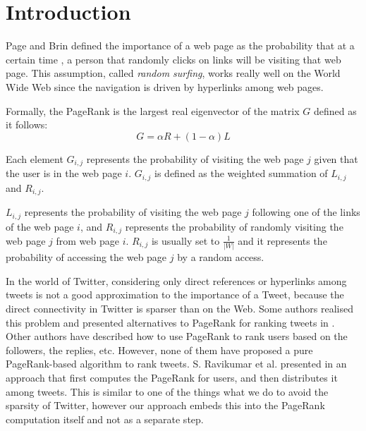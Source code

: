 \section{Introduction}
Page and Brin defined the importance of a web page as the probability that at a certain time \cite{pagebmw98}, a person that randomly clicks on links will be visiting that web page. This assumption, called \emph{random surfing}, works really well on the World Wide Web since the navigation is driven by hyperlinks among web pages. 

Formally, the PageRank is the largest real eigenvector of the matrix $G$ defined as it follows:
\begin{equation}\label{eq:basic_pr}
G = \alpha R + (1-\alpha) L
\end{equation}

Each element $G_{i,j}$ represents the probability of visiting the web page $j$ given that the user is in the web page $i$. $G_{i,j}$ is defined as the weighted summation of $L_{i,j}$ and $R_{i,j}$.

$L_{i,j}$ represents the probability of visiting the web page $j$ following one of the links of the web page $i$, and $R_{i,j}$ represents the probability of randomly visiting the web page $j$ from web page $i$. $R_{i,j}$ is usually set to $\frac{1}{|W|}$ and it represents the probability of accessing the web page $j$ by a random access. 

In the world of Twitter, considering only direct references or hyperlinks among tweets is not a good approximation to the importance of a Tweet, because the direct connectivity in Twitter is sparser than on the Web. Some authors realised this problem and presented alternatives to PageRank for ranking tweets in \cite{Duan:2010:ESL:1873781.1873815,DBLP:conf/webi/NagmotiTC10}. Other authors \cite{Duan:2010:ESL:1873781.1873815,Kwak:2010:TSN:1772690.1772751,DBLP:conf/wsdm/WelchSHC11} have described how to use PageRank to rank users based on the followers, the replies, etc. However, none of them have proposed a pure PageRank-based algorithm to rank tweets. S. Ravikumar et al. presented in \cite{DBLP:journals/corr/abs-1204-0156} an approach that first computes the PageRank for users, and then distributes it among tweets. This is similar to one of the things what we do to avoid the sparsity of Twitter, however our approach embeds this into the PageRank computation itself and not as a separate step.

